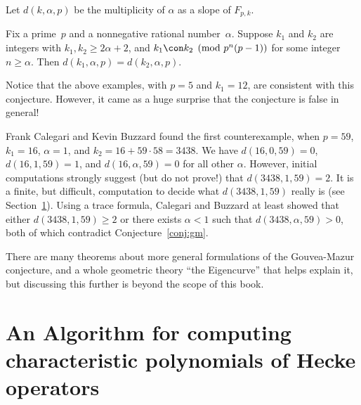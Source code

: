 \documentclass{report}
\begin{document}

Let $d(k,\alpha,p)$ be the multiplicity of $\alpha$ as a slope of
$F_{p,k}$.
\begin{conjecture}\label{conj:gm}
Fix a prime~$p$ and a nonnegative rational number~$\alpha$.
Suppose $k_1$ and $k_2$ are integers with $k_1, k_2\geq
2\alpha+2$, and $k_1\con k_2\pmod{p^n(p-1)}$ for some integer $n\geq
\alpha$.  Then $d(k_1,\alpha,p) = d(k_2,\alpha,p)$.
\end{conjecture}
Notice that the above examples, with $p=5$ and $k_1=12$, are
consistent with this conjecture.  However, it came as a huge surprise
that the conjecture is false in general!

Frank Calegari and Kevin Buzzard \cite{buzzard-calegari:gm} found the
first counterexample, when $p=59$, $k_1=16$, $\alpha=1$, and
$k_2=16+59\cdot 58=3438$.  We have $d(16,0,59)=0$, $d(16,1,59)=1$,
and $d(16,\alpha,59)=0$ for all other $\alpha$.  However, initial
computations strongly suggest (but do not prove!) that
$d(3438,1,59)=2$.  It is a finite, but
difficult, computation to decide what $d(3438,1,59)$ really is
(see Section~\ref{sec:charpoly_alg}).  Using
a trace formula, Calegari and Buzzard at least showed that either
$d(3438,1,59)\geq 2$ or there exists $\alpha<1$ such that
$d(3438,\alpha,59)>0$, both of which contradict
Conjecture~\ref{conj:gm}.


There are many theorems about more general formulations of the
Gouvea-Mazur conjecture, and a whole geometric theory ``the
Eigencurve'' \cite{eigencurve} that helps explain it, but
discussing this further is beyond the scope of this book.

\section{An Algorithm for computing characteristic
polynomials of Hecke operators}\label{sec:charpoly_alg}
\newcommand{\be}{\mathbf{e}}
\end{document}
